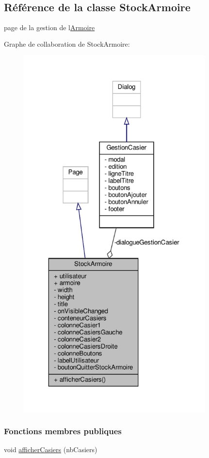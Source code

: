 \hypertarget{class_stock_armoire}{}\subsection{Référence de la classe Stock\+Armoire}
\label{class_stock_armoire}


page de la gestion de l\textquotesingle{}\hyperlink{class_armoire}{Armoire}  




Graphe de collaboration de Stock\+Armoire\+:\nopagebreak
\begin{figure}[H]
\begin{center}
\leavevmode
\includegraphics[height=550pt]{class_stock_armoire__coll__graph}
\end{center}
\end{figure}
\subsubsection*{Fonctions membres publiques}
\begin{DoxyCompactItemize}
\item 
void \hyperlink{class_stock_armoire_aa8bfe83269e3ba0bb8328257ff80b7fb}{afficher\+Casiers} (nb\+Casiers)
\end{DoxyCompactItemize}
